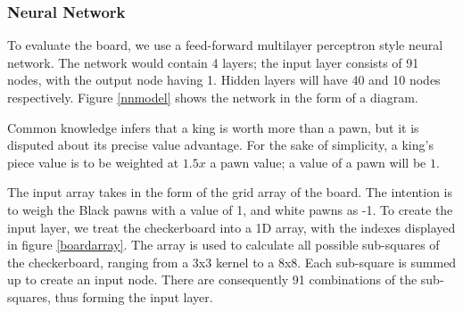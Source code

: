 \documentclass[12pt,a4paper]{article}
\begin{document}
\begin{figure}[ht!]
    \end{figure}
 

\subsubsection{Neural Network}

    To evaluate the board, we use a feed-forward multilayer perceptron style neural network. The network would contain 4 layers; the input layer consists of 91 nodes, with the output node having 1. Hidden layers will have 40 and 10 nodes respectively. Figure \ref{nnmodel} shows the network in the form of a diagram.

    Common knowledge infers that a king is worth more than a pawn, but it is disputed about its precise value advantage. For the sake of simplicity, a king's piece value is to be weighted at $1.5x$ a pawn value; a value of a pawn will be $1$. 

    The input array takes in the form of the grid array of the board. The intention is to weigh the Black pawns with a value of 1, and white pawns as -1. To create the input layer, we treat the checkerboard into a 1D array, with the indexes displayed in figure \ref{boardarray}. The array is used to calculate all possible sub-squares of the checkerboard, ranging from a 3x3 kernel to a 8x8. Each sub-square is summed up to create an input node. There are consequently 91 combinations of the sub-squares, thus forming the input layer. 
\end{document}
